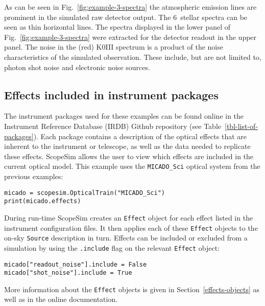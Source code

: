 As can be seen in Fig.~\ref{fig:example-3-spectra} the atmospheric
emission lines are prominent in the simulated raw detector output.
The 6~stellar spectra can be seen as thin horizontal lines.  The
spectra displayed in the lower panel of
Fig.~\ref{fig:example-3-spectra} were extracted for the detector
readout in the upper panel.  The noise in the (red) K0III spectrum is
a product of the noise characteristics of the simulated observation.
These include, but are not limited to, photon shot noise and
electronic noise sources.


\subsection{Effects included in instrument packages}
\label{effects-included-in-instrument-packages}

The instrument packages used for these examples can be found online in
the Instrument Reference Database (IRDB) Github repository (see
Table~\ref{tbl-list-of-packages}).  Each package contains a
description of the optical effects that are inherent to the instrument
or telescope, as well as the data needed to replicate these effects.
ScopeSim allows the user to view which effects are included in the
current optical model.  This example uses the \lstinline{MICADO_Sci}
optical system from the previous examples:

\begin{lstlisting}[frame=single]
micado = scopesim.OpticalTrain("MICADO_Sci")
print(micado.effects)
\end{lstlisting}

During run-time ScopeSim creates an \lstinline{Effect} object for each
effect listed in the instrument configuration files.  It then applies
each of these \lstinline{Effect} objects to the on-sky \lstinline{Source}
description in turn.  Effects can be included or excluded from a
simulation by using the \lstinline{.include} flag on the relevant
\lstinline{Effect} object:

\begin{lstlisting}[frame=single]
micado["readout_noise"].include = False
micado["shot_noise"].include = True
\end{lstlisting}

More information about the \lstinline{Effect} objects is given in
Section~\ref{effects-objects} as well as in the online documentation.

